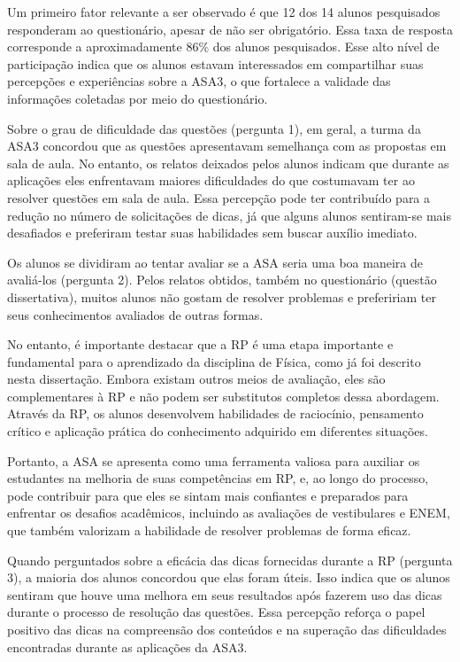 Um primeiro fator relevante a ser observado é que 12 dos 14 alunos pesquisados responderam ao questionário, apesar de não ser obrigatório. Essa taxa de resposta corresponde a aproximadamente 86\% dos alunos pesquisados. Esse alto nível de participação indica que os alunos estavam interessados em compartilhar suas percepções e experiências sobre a ASA3, o que fortalece a validade das informações coletadas por meio do questionário.

Sobre o grau de dificuldade das questões (pergunta 1), em geral, a turma da ASA3 concordou que as questões apresentavam semelhança com as propostas em sala de aula. No entanto, os relatos deixados pelos alunos indicam que durante as aplicações eles enfrentavam maiores dificuldades do que costumavam ter ao resolver questões em sala de aula. Essa percepção pode ter contribuído para a redução no número de solicitações de dicas, já que alguns alunos sentiram-se mais desafiados e preferiram testar suas habilidades sem buscar auxílio imediato.

Os alunos se dividiram ao tentar avaliar se a ASA seria uma boa maneira de avaliá-los (pergunta 2). Pelos relatos obtidos, também no questionário (questão dissertativa), muitos alunos não gostam de resolver problemas e prefeririam ter seus conhecimentos avaliados de outras formas.

No entanto, é importante destacar que a RP é uma etapa importante e fundamental para o aprendizado da disciplina de Física, como já foi descrito nesta dissertação. Embora existam outros meios de avaliação, eles são complementares à RP e não podem ser substitutos completos dessa abordagem. Através da RP, os alunos desenvolvem habilidades de raciocínio, pensamento crítico e aplicação prática do conhecimento adquirido em diferentes situações.

Portanto, a ASA se apresenta como uma ferramenta valiosa para auxiliar os estudantes na melhoria de suas competências em RP, e, ao longo do processo, pode contribuir para que eles se sintam mais confiantes e preparados para enfrentar os desafios acadêmicos, incluindo as avaliações de vestibulares e ENEM, que também valorizam a habilidade de resolver problemas de forma eficaz.

Quando perguntados sobre a eficácia das dicas fornecidas durante a RP (pergunta 3), a maioria dos alunos concordou que elas foram úteis. Isso indica que os alunos sentiram que houve uma melhora em seus resultados após fazerem uso das dicas durante o processo de resolução das questões. Essa percepção reforça o papel positivo das dicas na compreensão dos conteúdos e na superação das dificuldades encontradas durante as aplicações da ASA3.

